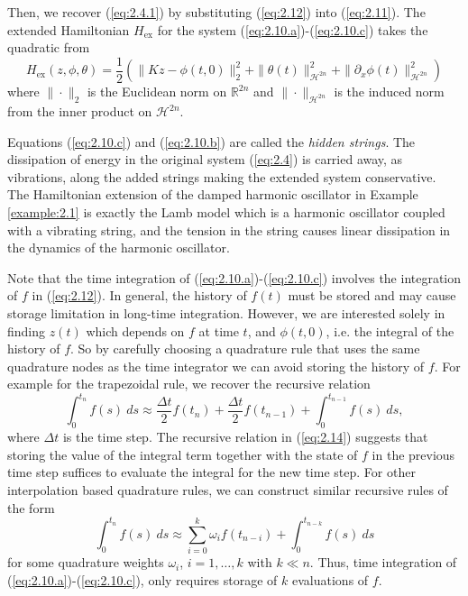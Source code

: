 Then, we recover (\ref{eq:2.4.1}) by substituting (\ref{eq:2.12}) into (\ref{eq:2.11}). The extended Hamiltonian $H_\text{ex}$ for the system (\ref{eq:2.10.a})-(\ref{eq:2.10.c}) takes the quadratic from
\begin{equation} \label{eq:2.13}
	H_\text{ex}(z,\phi,\theta) = \frac 1 2 \left( \| Kz - \phi(t,0) \|_2^2 + \| \theta(t) \|^2_{\mathcal H^{2n} } + \| \partial_x\phi(t)\|^2_{\mathcal H^{2n} }\right)
\end{equation}
where $\| \cdot \|_2$ is the Euclidean norm on $\mathbb R^{2n}$ and $\| \cdot \|_{\mathcal H^{2n}}$ is the induced norm from the inner product on $\mathcal H^{2n}$. 

Equations (\ref{eq:2.10.c}) and (\ref{eq:2.10.b}) are called the \emph{hidden strings}. The dissipation of energy in the original system (\ref{eq:2.4}) is carried away, as vibrations, along the added strings making the extended system conservative. The Hamiltonian extension of the damped harmonic oscillator in Example \ref{example:2.1} is exactly the Lamb model \cite{lamb:1900} which is a harmonic oscillator coupled with a vibrating string, and the tension in the string causes linear dissipation in the dynamics of the harmonic oscillator.

Note that the time integration of (\ref{eq:2.10.a})-(\ref{eq:2.10.c}) involves the integration of $f$ in (\ref{eq:2.12}). In general, the history of $f(t)$ must be stored and may cause storage limitation in long-time integration. However, we are interested solely in finding $z(t)$ which depends on $f$ at time $t$, and $\phi(t,0)$, i.e. the integral of the history of $f$. So by carefully choosing a quadrature rule that uses the same quadrature nodes as the time integrator we can avoid storing the history of $f$. For example for the trapezoidal rule, we recover the recursive relation
\begin{equation} \label{eq:2.14}
	\int_{0}^{t_n} f(s) \ ds \approx \frac{\Delta t}{2} f(t_n) + \frac{\Delta t}{2} f(t_{n-1}) + \int_{0}^{t_{n-1}} f(s) \ ds,
\end{equation}
where $\Delta t$ is the time step. The recursive relation in (\ref{eq:2.14}) suggests that storing the value of the integral term together with the state of $f$ in the previous time step suffices to evaluate the integral for the new time step. For other interpolation based quadrature rules, we can construct similar recursive rules of the form
\begin{equation}
	\int_{0}^{t_n} f(s) \ ds \approx \sum_{i=0}^{k} \omega_i f(t_{n-i})  + \int_{0}^{t_{n-k}} f(s) \ ds
\end{equation}
for some quadrature weights $\omega_i$, $i=1,\dots,k$ with $k\ll n$. Thus, time integration of (\ref{eq:2.10.a})-(\ref{eq:2.10.c}), only requires storage of $k$ evaluations of $f$.
